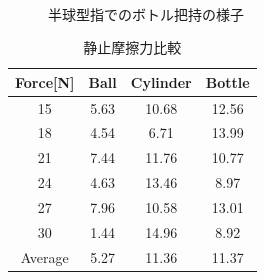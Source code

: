 \begin{figure}[htbp]
\hspace{5mm}\\
\caption{半球型指でのボトル把持の様子}
\label{fig::cap_grasp}
\end{figure}

\begin{table}[t]
    \caption{静止摩擦力比較}
   \label{tab::e3}
   \centering
   \begin{tabular}{|c||c|c|c|} \hline
   Force[N]   &Ball     &Cylinder      &Bottle    \\ \hline \hline
        15 & 5.63 & 10.68 & 12.56   \\ \hline
        18  & 4.54 & 6.71  & 13.99    \\ \hline
        21  & 7.44 & 11.76  & 10.77    \\ \hline
		24  & 4.63 & 13.46  & 8.97   \\ \hline
		27  & 7.96 & 10.58  & 13.01   \\ \hline			
		30 & 1.44 & 14.96  & 8.92   \\ \hline
		Average  & 5.27 & 11.36  & 11.37   \\ \hline
		 \end{tabular}
\end{table}

